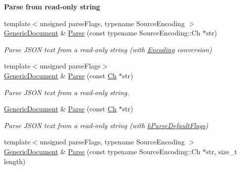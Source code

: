 \begin{Indent}\textbf{ Parse from read-\/only string}\par
\begin{DoxyCompactItemize}
\item 
{\footnotesize template$<$unsigned parse\+Flags, typename Source\+Encoding $>$ }\\\mbox{\hyperlink{classrapidjson_1_1_generic_document}{Generic\+Document}} \& \mbox{\hyperlink{classrapidjson_1_1_generic_document_aea842b533a858c9a3861451ad9e8642c}{Parse}} (const typename Source\+Encoding\+::\+Ch $\ast$str)
\begin{DoxyCompactList}\small\item\em Parse J\+S\+ON text from a read-\/only string (with \mbox{\hyperlink{classrapidjson_1_1_encoding}{Encoding}} conversion) \end{DoxyCompactList}\item 
{\footnotesize template$<$unsigned parse\+Flags$>$ }\\\mbox{\hyperlink{classrapidjson_1_1_generic_document}{Generic\+Document}} \& \mbox{\hyperlink{classrapidjson_1_1_generic_document_a42c35e2f64c288f14b74fec2792500c8}{Parse}} (const \mbox{\hyperlink{classrapidjson_1_1_generic_value_adcdbc7fa85a9a41b78966d7e0dcc2ac4}{Ch}} $\ast$str)
\begin{DoxyCompactList}\small\item\em Parse J\+S\+ON text from a read-\/only string. \end{DoxyCompactList}\item 
\mbox{\hyperlink{classrapidjson_1_1_generic_document}{Generic\+Document}} \& \mbox{\hyperlink{classrapidjson_1_1_generic_document_ab031375318d133f83a114314b75703de}{Parse}} (const \mbox{\hyperlink{classrapidjson_1_1_generic_value_adcdbc7fa85a9a41b78966d7e0dcc2ac4}{Ch}} $\ast$str)
\begin{DoxyCompactList}\small\item\em Parse J\+S\+ON text from a read-\/only string (with \mbox{\hyperlink{namespacerapidjson_a81379eb4e94a0386d71d15fda882ebc9a5640cb00db7814b7f22be3683dda9835}{k\+Parse\+Default\+Flags}}) \end{DoxyCompactList}\item 
{\footnotesize template$<$unsigned parse\+Flags, typename Source\+Encoding $>$ }\\\mbox{\hyperlink{classrapidjson_1_1_generic_document}{Generic\+Document}} \& \mbox{\hyperlink{classrapidjson_1_1_generic_document_ab5b308584e4bea9f59e0ba32ebd22b16}{Parse}} (const typename Source\+Encoding\+::\+Ch $\ast$str, size\+\_\+t length)

\end{DoxyCompactItemize}
\end{Indent}
